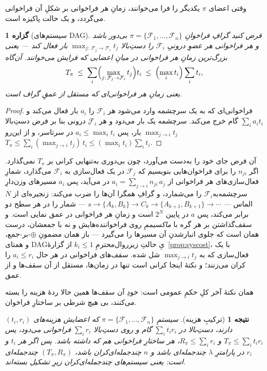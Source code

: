 \documentclass[10pt,oneside,openany]{book}
\newcommand{\F}{\mathcal{F}}
\theoremstyle{accentdef}
\theoremstyle{accentplain}
\newtheorem{proposition}[definition]{گزاره}
\newtheorem{corollary}[definition]{نتیجه}
\begin{document}
وقتی اعضای $\pi$ یکدیگر را فرا می‌خوانند، زمانِ هر فراخوانی بر شکلِ آن
فراخوانی می‌گردد، و یک حالت پاکیزه است.

\begin{proposition}[سیستم‌های DAG]\label{prop:dagcost}
فرض کنید گرافِ فراخوانِ $\pi = \{\F_1,\dots,\F_n\}$ بی‌دور باشد و هر
فراخوانی هر عضوِ درونیِ $\F_i$ را دستِ‌بالا $\max_{j:\,\F_j \to \F_i} t_j$
بار فعال کند --- یعنی بزرگ‌ترین زمانِ هر فراخوانی در میانِ اعضایی که فرایش
می‌خوانند. آن‌گاه
\[
  T_\pi \;\le\; \sum_i \Bigl(\max_{j:\,\F_j \to \F_i} t_j\Bigr) t_i \;\le\; \Bigl(\max_i t_i\Bigr) \sum_i t_i ,
\]
یعنی زمانِ هر فراخوانی‌ای که مستقل از عمقِ گراف است.
\end{proposition}

\begin{proof}
فراخوانی‌ای که به یک سرچشمه وارد می‌شود هر $\F_i$ را $a_i$ بار فعال می‌کند و
$\sum_i a_i t_i$ گام خرج می‌کند. سرچشمه یک بار می‌دود و هر $\F_i$ِ درونی
بنا بر فرض دستِ‌بالا $\max_{j \to i} t_j$ بار، پس $a_i \le \max_i t_i$ در
سرتاسر، و از این‌رو $T_\pi \le \sum_i (\max_{j\to i} t_j)\, t_i \le (\max_i
t_i) \sum_i t_i$.
\end{proof}

آن فرض جای خود را به‌دست می‌آورد، چون بی‌دوری به‌تنهایی کرانی بر $T_\pi$
نمی‌گذارد. اگر $n_{ji}$ را برای فراخوان‌هایی بنویسیم که $\F_j$ در یک
فعال‌سازی به $\F_i$ می‌گذارد، شمارِ فعال‌سازی‌های هر فراخوانی از $a_i =
\sum_{j \to i} n_{ji}\, a_j$ در می‌آید، پس $a_i$ مسیرهای وزن‌دارِ
سرچشمه‌به‌$\F_i$ را می‌شمارد، و گرافِ همگرا آن‌ها را ضرب می‌کند: زنجیره‌ای از
$N$ الماس --- $s \to \{A_k, B_k\} \to C_k \to \{A_{k+1}, B_{k+1}\} \to
\dotsb$ --- شمار را در هر سطح دو برابر می‌کند، پس $a$ در پایین $2^N$ است و
زمانِ هر فراخوانی در عمق نمایی است. و سقف‌گذاشتن بر هر گره با
\emph{ماکسیممِ} روی فراخواننده‌هایش و نه با جمعشان، درست همان است که جلوی
انبار‌شدنِ آن مسیرها را می‌گیرد --- باز همان مضمونِ $\oplus$-بر-جمع، و
همتای DAGیِ حالتِ زیرروال‌محترمِ $k_i \le 1$ از
گزارهٔ~\ref{prop:syscost}، با یک فعال‌سازی که به $\max_{j\to i} t_j$ شل شده.
سقف‌های فراخوانی در هر حال $a_i \le r_i$ را کران می‌زنند؛ و نکتهٔ اینجا
کرانی است تنها در زمان‌ها، مستقل از آن سقف‌ها و از عمق.

همان نکتهٔ آخر کلِ حکمِ عمومی است: خودِ آن سقف‌ها همین حالا ردهٔ هزینه را
بسته می‌کنند، بی هیچ شرطی بر ساختارِ فراخوان.

\begin{corollary}[ترکیبِ هزینه]\label{cor:costcomp}
سیستمِ $\pi = \{\F_1,\dots,\F_n\}$ که اعضایش هزینه‌های $(t_i, r_i)$ دارند،
دستِ‌بالا در $\sum_i t_i r_i$ گام و روی دستِ‌بالا $\sum_i r_i$ فراخوانی
می‌دود، پس $T_\pi \le \sum_i t_i r_i$ و $R_\pi \le \sum_i r_i$، هر ساختارِ
فراخوانی هم که داشته باشد. پس اگر هر $t_i$ و $r_i$ در پارامترِ $\lambda$
چندجمله‌ای باشد و $n$ چندجمله‌ای‌کران باشد، $(T_\pi, R_\pi)$ چندجمله‌ای است:
یعنی سیستم‌های چندجمله‌ای‌کران زیرِ تشکیل بسته‌اند.
\end{corollary}
\end{document}
